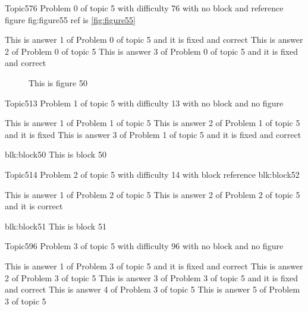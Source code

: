 \documentclass[master]{exam}
\begin{document}
\begin{problem}{Topic5}{76}
	Problem 0 of topic 5 with difficulty 76 with no block and reference figure fig:figure55 ref is \ref{fig:figure55}
	\begin{answers}
		 This is answer 1 of Problem 0 of topic 5 and it is fixed and correct
		\answer This is answer 2 of Problem 0 of topic 5 
		 This is answer 3 of Problem 0 of topic 5 and it is fixed and correct
	\end{answers}
\end{problem}



\begin{figure}
	\begin{center}
		This is figure 50 
		\label{fig:figure50}
	\end{center}
\end{figure}

\begin{problem}{Topic5}{13}
	Problem 1 of topic 5 with difficulty 13 with no block and no figure
	\begin{answers}
		\answer This is answer 1 of Problem 1 of topic 5 
		\answer[fixed] This is answer 2 of Problem 1 of topic 5 and it is fixed
		 This is answer 3 of Problem 1 of topic 5 and it is fixed and correct
	\end{answers}
\end{problem}



\begin{block}{blk:block50}
This is block 50
\end{block}


\begin{problem}[requires=blk:block52]{Topic5}{14}
	Problem 2 of topic 5 with difficulty 14 with block reference blk:block52
	\begin{answers}
		\answer This is answer 1 of Problem 2 of topic 5 
		\answer[correct] This is answer 2 of Problem 2 of topic 5 and it is correct
	\end{answers}
\end{problem}



\begin{block}{blk:block51}
This is block 51
\end{block}


\begin{problem}{Topic5}{96}
	Problem 3 of topic 5 with difficulty 96 with no block and no figure
	\begin{answers}
		 This is answer 1 of Problem 3 of topic 5 and it is fixed and correct
		\answer This is answer 2 of Problem 3 of topic 5 
		 This is answer 3 of Problem 3 of topic 5 and it is fixed and correct
		\answer This is answer 4 of Problem 3 of topic 5 
		\answer This is answer 5 of Problem 3 of topic 5 
	\end{answers}
\end{problem}
\end{document}
